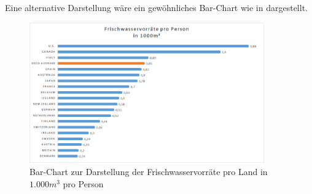 \documentclass[a4paper,12pt,ngerman]{scrartcl}
\begin{document}
Eine alternative Darstellung wäre ein gewöhnliches Bar-Chart wie in  dargestellt.

\begin{figure}
    \centering
    \includegraphics[width=0.9\textwidth]{includes/frischwasser-bar}
    \caption{Bar-Chart zur Darstellung der Frischwasservorräte pro Land in $1.000 m^3$ pro Person}
    \label{frischwasser-bar}
\end{figure}
\end{document}
